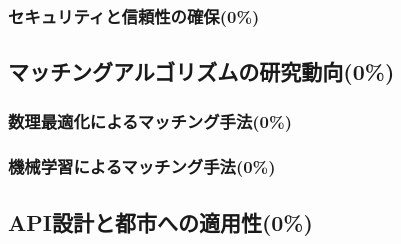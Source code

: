       \subsubsection{セキュリティと信頼性の確保(0\%)}
        \label{sec:セキュリティと信頼性の確保}
          \par  
  
  \subsection{マッチングアルゴリズムの研究動向(0\%)}
    \label{sec:マッチングアルゴリズムの研究動向}
      \par 
      
      \subsubsection{数理最適化によるマッチング手法(0\%)}
        \label{sec:数理最適化によるマッチング手法}
          \par
          
      \subsubsection{機械学習によるマッチング手法(0\%)}
        \label{sec:機械学習によるマッチング手法}
          \par    
          
  \subsection{API設計と都市への適用性(0\%)}
    \label{sec:API設計と都市への適用性}
      \par 

